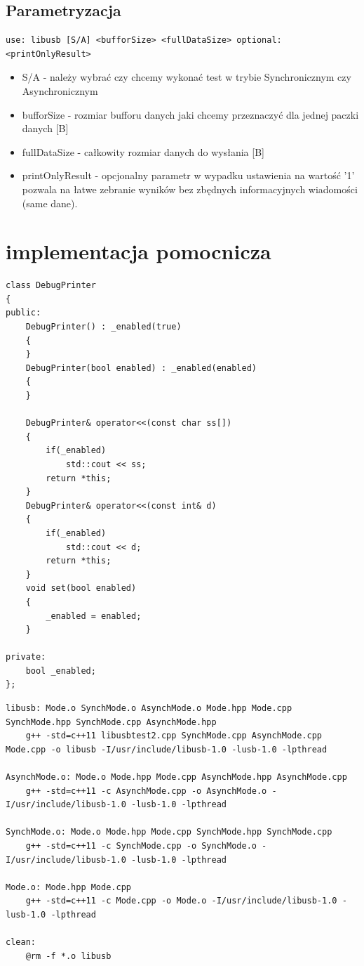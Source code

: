 \documentclass{BscUS}
\begin{document}
\subsection{Parametryzacja}
\begin{lstlisting}[caption={uruchomienie testu},label={lst:main}]
use: libusb [S/A] <bufforSize> <fullDataSize> optional:<printOnlyResult>
\end{lstlisting}
\begin{itemize}
\item S/A - należy wybrać czy chcemy wykonać test w trybie Synchronicznym czy Asynchronicznym
\item bufforSize - rozmiar bufforu danych jaki chcemy przeznaczyć dla jednej paczki danych [B]
\item fullDataSize - całkowity rozmiar danych do wysłania [B]
\item printOnlyResult - opcjonalny parametr w wypadku ustawienia na wartość '1' pozwala na łatwe zebranie wyników bez zbędnych informacyjnych wiadomości (same dane). 
\end{itemize}
\section{implementacja pomocnicza}
\begin{lstlisting}[caption={Klasa DebugPrinter},label={lst:CDebugPrinter}]
class DebugPrinter
{
public:
	DebugPrinter() : _enabled(true)
	{
	}
	DebugPrinter(bool enabled) : _enabled(enabled)
	{
	}
	
	DebugPrinter& operator<<(const char ss[])
	{
		if(_enabled)
			std::cout << ss;
		return *this;
	}
	DebugPrinter& operator<<(const int& d)
	{
		if(_enabled)
			std::cout << d;
		return *this;
	}
	void set(bool enabled)
	{
		_enabled = enabled;
	}

private:
	bool _enabled;
};
\end{lstlisting}

\begin{lstlisting}[caption={Makefile},label={lst:makefile}]
libusb: Mode.o SynchMode.o AsynchMode.o Mode.hpp Mode.cpp SynchMode.hpp SynchMode.cpp AsynchMode.hpp
	g++ -std=c++11 libusbtest2.cpp SynchMode.cpp AsynchMode.cpp Mode.cpp -o libusb -I/usr/include/libusb-1.0 -lusb-1.0 -lpthread

AsynchMode.o: Mode.o Mode.hpp Mode.cpp AsynchMode.hpp AsynchMode.cpp
	g++ -std=c++11 -c AsynchMode.cpp -o AsynchMode.o -I/usr/include/libusb-1.0 -lusb-1.0 -lpthread

SynchMode.o: Mode.o Mode.hpp Mode.cpp SynchMode.hpp SynchMode.cpp
	g++ -std=c++11 -c SynchMode.cpp -o SynchMode.o -I/usr/include/libusb-1.0 -lusb-1.0 -lpthread

Mode.o: Mode.hpp Mode.cpp
	g++ -std=c++11 -c Mode.cpp -o Mode.o -I/usr/include/libusb-1.0 -lusb-1.0 -lpthread

clean:
	@rm -f *.o libusb
\end{lstlisting}
\end{document}
